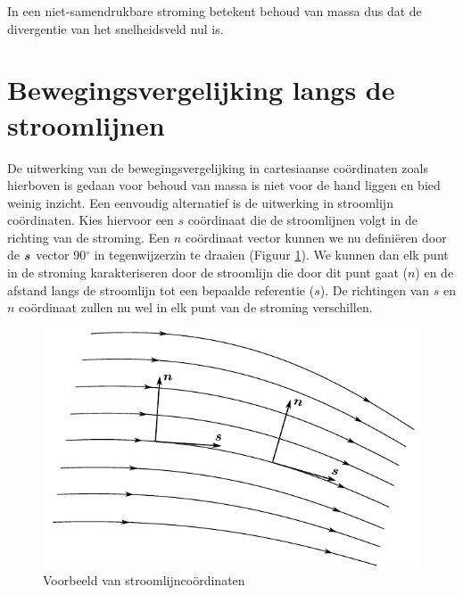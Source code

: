 In een niet-samendrukbare stroming betekent behoud van massa dus dat de divergentie van het snelheidsveld nul is.

	\section{Bewegingsvergelijking langs de stroomlijnen}
	\label{sec:Bewegingsvergelijking langs de stroomlijnen}
De uitwerking van de bewegingsvergelijking in cartesiaanse coördinaten zoals hierboven is gedaan voor behoud van massa is niet voor de hand liggen en bied weinig inzicht. Een eenvoudig alternatief is de uitwerking in stroomlijn coördinaten. Kies hiervoor een $s$ coördinaat die de stroomlijnen volgt in de richting van de stroming. Een $n$ coördinaat vector kunnen we nu definiëren door de $\boldsymbol{s}$ vector 90$^\circ$ in tegenwijzerzin te draaien (Figuur \ref{fig:stroomlijncoordinaten}). We kunnen dan elk punt in de stroming karakteriseren door de stroomlijn die door dit punt gaat ($n$) en de afstand langs de stroomlijn tot een bepaalde referentie ($s$). De richtingen van $s$ en $n$ coördinaat zullen nu wel in elk punt van de stroming verschillen. 
\begin{figure}[htb]
	\centering
	\includegraphics{fig/deeltjesvergelijkingen/Stoomlijncoordinaten}
	\caption{Voorbeeld van stroomlijncoördinaten}
	\label{fig:stroomlijncoordinaten}
\end{figure}

